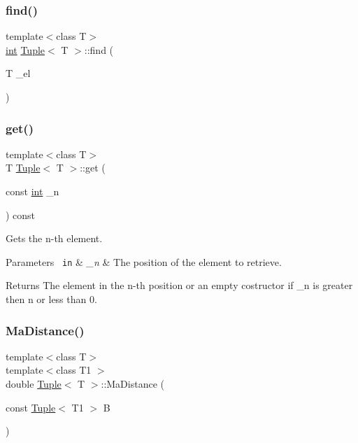 \subsubsection{\texorpdfstring{find()}{find()}}
{\footnotesize\ttfamily template$<$class T$>$ \\
\mbox{\hyperlink{draw_8hh_aa620a13339ac3a1177c86edc549fda9b}{int}} \mbox{\hyperlink{class_tuple}{Tuple}}$<$ T $>$\+::find (\begin{DoxyParamCaption}\item[{T}]{\+\_\+el }\end{DoxyParamCaption})\hspace{0.3cm}{\ttfamily [inline]}}

\mbox{\label{class_tuple_aabf82c5d0f19c9a8f6a8f01d95801162}} 
\subsubsection{\texorpdfstring{get()}{get()}}
{\footnotesize\ttfamily template$<$class T$>$ \\
T \mbox{\hyperlink{class_tuple}{Tuple}}$<$ T $>$\+::get (\begin{DoxyParamCaption}\item[{const \mbox{\hyperlink{draw_8hh_aa620a13339ac3a1177c86edc549fda9b}{int}}}]{\+\_\+n }\end{DoxyParamCaption}) const\hspace{0.3cm}{\ttfamily [inline]}}



Gets the n-\/th element. 


\begin{DoxyParams}[1]{Parameters}
\mbox{\texttt{ in}}  & {\em \+\_\+n} & The position of the element to retrieve. \\
\hline
\end{DoxyParams}
\begin{DoxyReturn}{Returns}
The element in the n-\/th position or an empty costructor if \+\_\+n is greater then n or less than 0. 
\end{DoxyReturn}
\mbox{\label{class_tuple_ac668269743d9be71769c9b4a424c785f}} 
\subsubsection{\texorpdfstring{MaDistance()}{MaDistance()}}
{\footnotesize\ttfamily template$<$class T$>$ \\
template$<$class T1 $>$ \\
double \mbox{\hyperlink{class_tuple}{Tuple}}$<$ T $>$\+::Ma\+Distance (\begin{DoxyParamCaption}\item[{const \mbox{\hyperlink{class_tuple}{Tuple}}$<$ T1 $>$}]{B }\end{DoxyParamCaption})\hspace{0.3cm}{\ttfamily [inline]}}



